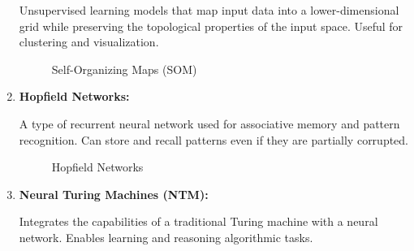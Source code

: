 \documentclass{article}
\begin{document}
\begin{enumerate}[label=\arabic*.]
          Unsupervised learning models that map input data into a lower-dimensional grid while preserving the topological properties of the input space. Useful for clustering and visualization.
          \begin{figure}[ht]
              \centering
              \caption{Self-Organizing Maps (SOM)}
          \end{figure}

    \item \textbf{Hopfield Networks:}

          A type of recurrent neural network used for associative memory and pattern recognition. Can store and recall patterns even if they are partially corrupted.
          \begin{figure}[ht]
              \centering
              \caption{Hopfield Networks}
          \end{figure}

    \item \textbf{Neural Turing Machines (NTM):}

          Integrates the capabilities of a traditional Turing machine with a neural network. Enables learning and reasoning algorithmic tasks.


\end{enumerate}
\end{document}
